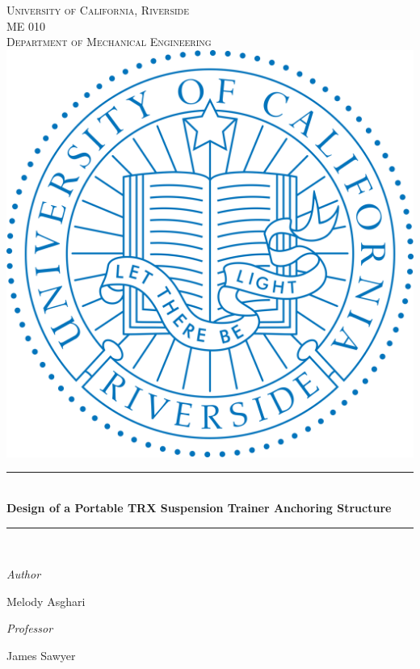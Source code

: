 \newcommand{\HRule}{\rule{\linewidth}{0.5mm}} 

\begin{titlepage}
\center
\textsc{
\huge{University of California, Riverside}\\[.5cm]
\huge{ME 010 }\\[.5cm]
\Large
Department of Mechanical Engineering\\[1cm] 
\includegraphics{UCR-logo}\\[1cm]
}

\sffamily
\HRule \\[0.4cm]
\textbf{\Huge Design of a Portable TRX Suspension Trainer Anchoring Structure}\\[0.2cm] 
\HRule \\[2cm]
 
\large
\begin{minipage}[t]{.4\textwidth}
\begin{flushleft}
\emph{Author}

Melody Asghari
\end{flushleft}

\end{minipage}\hfill\begin{minipage}[t]{.4\textwidth}

\begin{flushright}
\emph{Professor} 

James Sawyer\\ 
\end{flushright}
\end{minipage}
\\[2cm]


\end{titlepage}
